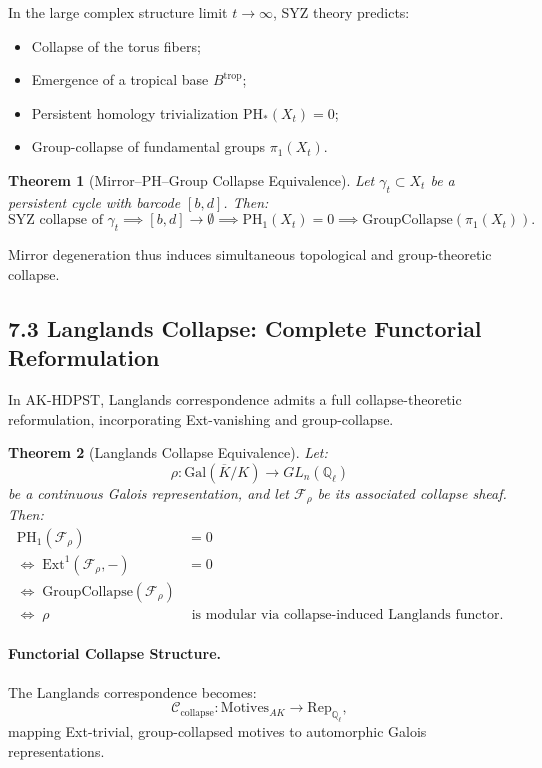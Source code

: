 \documentclass[11pt]{article}
\newtheorem{theorem}{Theorem}[section]
\begin{document}
In the large complex structure limit \( t \to \infty \), SYZ theory predicts:

\begin{itemize}
    \item Collapse of the torus fibers;
    \item Emergence of a tropical base \( B^{\mathrm{trop}} \);
    \item Persistent homology trivialization \( \mathrm{PH}_*(X_t) = 0 \);
    \item Group-collapse of fundamental groups \( \pi_1(X_t) \).
\end{itemize}

\begin{theorem}[Mirror–PH–Group Collapse Equivalence]
Let \( \gamma_t \subset X_t \) be a persistent cycle with barcode \( [b,d] \). Then:
\[
\text{SYZ collapse of } \gamma_t \implies [b,d] \to \emptyset \implies \mathrm{PH}_1(X_t) = 0 \implies \text{GroupCollapse}(\pi_1(X_t)).
\]
\end{theorem}

Mirror degeneration thus induces simultaneous topological and group-theoretic collapse.

\subsection*{7.3 Langlands Collapse: Complete Functorial Reformulation}

In AK-HDPST, Langlands correspondence admits a full collapse-theoretic reformulation, incorporating Ext-vanishing and group-collapse.

\begin{theorem}[Langlands Collapse Equivalence]
Let:
\[
\rho: \mathrm{Gal}(\overline{K}/K) \longrightarrow GL_n(\mathbb{Q}_\ell)
\]
be a continuous Galois representation, and let \( \mathcal{F}_\rho \) be its associated collapse sheaf. Then:
\begin{align*}
\mathrm{PH}_1(\mathcal{F}_\rho) &= 0 \\
\iff\; \mathrm{Ext}^1(\mathcal{F}_\rho, -) &= 0 \\
\iff\; \mathrm{GroupCollapse}(\mathcal{F}_\rho) \\
\iff\; \rho &\text{ is modular via collapse-induced Langlands functor}.
\end{align*}
\end{theorem}

\paragraph{Functorial Collapse Structure.}
The Langlands correspondence becomes:
\[
\mathcal{C}_{\mathrm{collapse}}: \mathrm{Motives}_{AK} \longrightarrow \mathrm{Rep}_{\mathbb{Q}_\ell},
\]
mapping Ext-trivial, group-collapsed motives to automorphic Galois representations.
\end{document}
